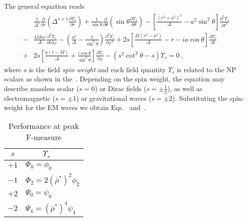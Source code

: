 The general equation reads
\begin{align}
    \begin{split}
        & \frac{1}{\Delta^s} \frac{\partial}{\partial r} \left( \Delta^{s+1} \frac{\partial \Upsilon_s}{\partial r} \right) 
        + \frac{1}{\sin\theta} \frac{\partial}{\partial\theta} \left( \sin\theta \frac{\partial \Upsilon_s}{\partial \theta} \right) 
        - \left[ \frac{(r^2+a^2)^2}{\Delta} - a^2 \sin^2\theta \right]\frac{\partial^2 \Upsilon_s}{\partial t^2} \\[0.15cm]
        - & \frac{4 M a r}{\Delta}\frac{\partial^2 \Upsilon_s}{\partial t \partial \varphi} 
        - \left( \frac{a^2}{\Delta} -\frac{1}{\sin^2\theta} \right)\frac{\partial^2 \Upsilon_s}{\partial \varphi^2} 
        + 2s\left[ \frac{M(r^2-a^2)}{\Delta} - r - i a \cos\theta \right] \frac{\partial \Upsilon_s}{\partial t} \\[0.15cm]
        + & 2s\left[ \frac{a(r-M)}{\Delta}+\frac{i \cos\theta}{\sin^2\theta}\right] \frac{\partial \Upsilon_s}{\partial \varphi}
        - (s^2 \cot^2\theta - s) \Upsilon_s = 0 ~,
    \end{split}
    \label{eq3:teukolsky}
\end{align}
where $s$ is the field \emph{spin weight} and each field quantity $\Upsilon_s$ is related to the NP scalars as shown in the~.
Depending on the spin weight, the equation may describe massless scalar ($s=0$) or Dirac fields ($s=\pm \tfrac{1}{2}$), as well as electromagnetic ($s=\pm 1$) or gravitational waves ($s=\pm 2$). Substituting the spin-weight for the EM waves we obtain Eqs.~ and~.
\begin{table}[h]
    \centering
    \renewcommand{\arraystretch}{1.25}
    \begin{tabular}{ | c | l | }
        \hline
        $s$ & $\qquad ~ \Upsilon_s$ \\
        \hline\hline
        $+1$ & $\Phi_0 = \phi_0$ \\
        \hline
        $-1$ & $\Phi_2 = 2 (\bar{\rho}^*)^2 \phi_2$ \\
        \hline
        $+2$ & $\Psi_0 = \psi_0$  \\
        \hline
        $-2$ & $\Psi_4 = (\bar{\rho}^*)^4 \psi_4$ \\
        \hline
    \end{tabular}
    \caption{Performance at peak F-measure}
    \label{tb3:solutionsTeukolskyEq}
\end{table}

